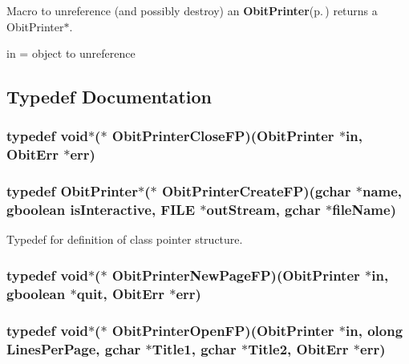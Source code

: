 Macro to unreference (and possibly destroy) an {\bf Obit\-Printer}{\rm (p.\,\pageref{structObitPrinter})} returns a Obit\-Printer$\ast$. 

in = object to unreference 

\subsection{Typedef Documentation}
\subsubsection{\setlength{\rightskip}{0pt plus 5cm}typedef void$\ast$($\ast$ {\bf Obit\-Printer\-Close\-FP})({\bf Obit\-Printer} $\ast$in, {\bf Obit\-Err} $\ast$err)}\label{ObitPrinter_8h_a6}


\subsubsection{\setlength{\rightskip}{0pt plus 5cm}typedef {\bf Obit\-Printer}$\ast$($\ast$ {\bf Obit\-Printer\-Create\-FP})(gchar $\ast$name, gboolean is\-Interactive, FILE $\ast$out\-Stream, gchar $\ast$file\-Name)}\label{ObitPrinter_8h_a3}


Typedef for definition of class pointer structure. 

\subsubsection{\setlength{\rightskip}{0pt plus 5cm}typedef void$\ast$($\ast$ {\bf Obit\-Printer\-New\-Page\-FP})({\bf Obit\-Printer} $\ast$in, gboolean $\ast$quit, {\bf Obit\-Err} $\ast$err)}\label{ObitPrinter_8h_a8}


\subsubsection{\setlength{\rightskip}{0pt plus 5cm}typedef void$\ast$($\ast$ {\bf Obit\-Printer\-Open\-FP})({\bf Obit\-Printer} $\ast$in, {\bf olong} Lines\-Per\-Page, gchar $\ast$Title1, gchar $\ast$Title2, {\bf Obit\-Err} $\ast$err)}\label{ObitPrinter_8h_a4}


